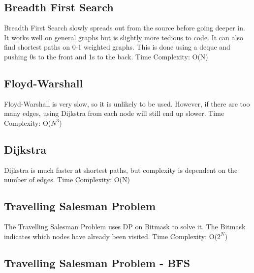 \documentclass{article}
\begin{document}
\subsection{Breadth First Search}
\begin{flushleft}
Breadth First Search slowly spreads out from the source before going deeper in.
It works well on general graphs but is slightly more tedious to code.
\newline
It can also find shortest paths on 0-1 weighted graphs.
This is done using a deque and pushing 0s to the front and 1s to the back.
\newline
Time Complexity: O(N)
\end{flushleft}


\subsection{Floyd-Warshall}
\begin{flushleft}
Floyd-Warshall is very slow, so it is unlikely to be used.
However, if there are too many edges, using Dijkstra from each node
will still end up slower.
\newline
Time Complexity: O($N^{3}$)
\end{flushleft}


\subsection{Dijkstra}
\begin{flushleft}
Dijkstra is much faster at shortest paths, but complexity is dependent
on the number of edges.
\newline
Time Complexity: O(N)
\end{flushleft}


\subsection{Travelling Salesman Problem}
\begin{flushleft}
The Travelling Salesman Problem uses DP on Bitmask to solve it.
The Bitmask indicates which nodes have already been visited.
\newline
Time Complexity: O($2^{N}$)
\end{flushleft}

\subsection{Travelling Salesman Problem - BFS}

\end{document}
